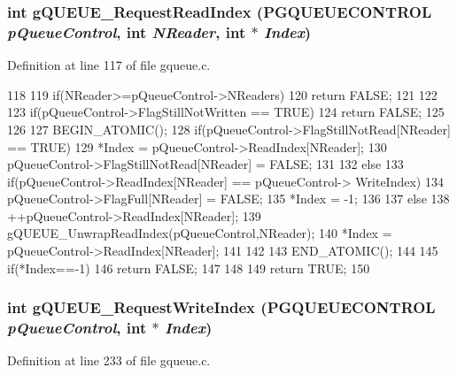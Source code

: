 \subsubsection[{gQUEUE\_\-RequestReadIndex}]{\setlength{\rightskip}{0pt plus 5cm}int gQUEUE\_\-RequestReadIndex ({\bf PGQUEUECONTROL} {\em pQueueControl}, \/  int {\em NReader}, \/  int $\ast$ {\em Index})}\label{gqueue_8c_ab5ba087de92285fb4f9ed8c46440ac6f}


Definition at line 117 of file gqueue.c.


\begin{DoxyCode}
118 {
119         if(NReader>=pQueueControl->NReaders){
120                 return FALSE;
121         }
122 
123         if(pQueueControl->FlagStillNotWritten == TRUE){
124                 return FALSE;
125         }
126     
127 BEGIN_ATOMIC();
128         if(pQueueControl->FlagStillNotRead[NReader] == TRUE){
129                 *Index = pQueueControl->ReadIndex[NReader];
130                 pQueueControl->FlagStillNotRead[NReader] = FALSE;
131         }
132         else{
133                 if(pQueueControl->ReadIndex[NReader] == pQueueControl->
      WriteIndex){
134                         pQueueControl->FlagFull[NReader] = FALSE;       
135                         *Index = -1;
136                 }
137                 else{
138                         ++pQueueControl->ReadIndex[NReader];
139                         gQUEUE_UnwrapReadIndex(pQueueControl,NReader);
140                         *Index = pQueueControl->ReadIndex[NReader];
141                 }
142         }
143 END_ATOMIC();
144 
145         if(*Index==-1){
146                 return FALSE;
147         }  
148 
149     return TRUE;
150 }                      
\end{DoxyCode}
\subsubsection[{gQUEUE\_\-RequestWriteIndex}]{\setlength{\rightskip}{0pt plus 5cm}int gQUEUE\_\-RequestWriteIndex ({\bf PGQUEUECONTROL} {\em pQueueControl}, \/  int $\ast$ {\em Index})}\label{gqueue_8c_a7324fa957e7713c05cab4eb7993dc2ee}


Definition at line 233 of file gqueue.c.


